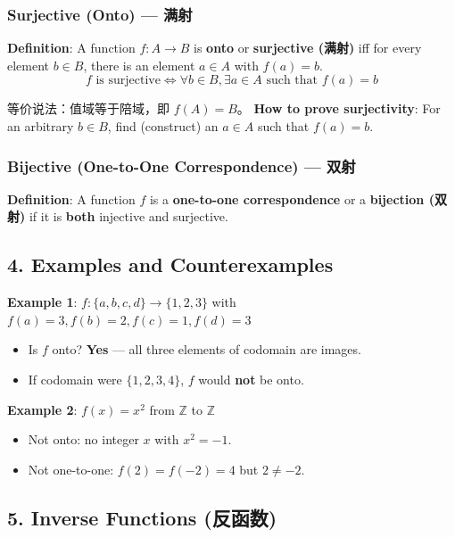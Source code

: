 \documentclass[10pt,a4paper,openany]{ctexbook}
\theoremstyle{definition}
\theoremstyle{remark}
\begin{document}
\subsubsection{Surjective (Onto) — 满射}

\textbf{Definition}: A function $f: A \to B$ is \textbf{onto} or \textbf{surjective (满射)} iff for every element $b \in B$, there is an element $a \in A$ with $f(a) = b$.
\[
f \text{ is surjective} \iff \forall b \in B, \exists a \in A \text{ such that } f(a) = b
\]

等价说法：值域等于陪域，即 $f(A) = B$。
\textbf{How to prove surjectivity}: For an arbitrary $b \in B$, find (construct) an $a \in A$ such that $f(a) = b$.
\subsubsection{Bijective (One-to-One Correspondence) — 双射}

\textbf{Definition}: A function $f$ is a \textbf{one-to-one correspondence} or a \textbf{bijection (双射)} if it is \textbf{both} injective and surjective.
\vspace{-2pt}

\subsection{4. Examples and Counterexamples}

\textbf{Example 1}: $f: \{a,b,c,d\} \to \{1,2,3\}$ with $f(a)=3, f(b)=2, f(c)=1, f(d)=3$
\begin{itemize}
\item Is $f$ onto? \textbf{Yes} — all three elements of codomain are images.
\item If codomain were $\{1,2,3,4\}$, $f$ would \textbf{not} be onto.

\end{itemize}

\textbf{Example 2}: $f(x) = x^2$ from $\mathbb{Z}$ to $\mathbb{Z}$
\begin{itemize}
\item Not onto: no integer $x$ with $x^2 = -1$.
\item Not one-to-one: $f(2) = f(-2) = 4$ but $2 \neq -2$.

\end{itemize}

\vspace{-2pt}

\subsection{5. Inverse Functions (反函数)}
\end{document}
